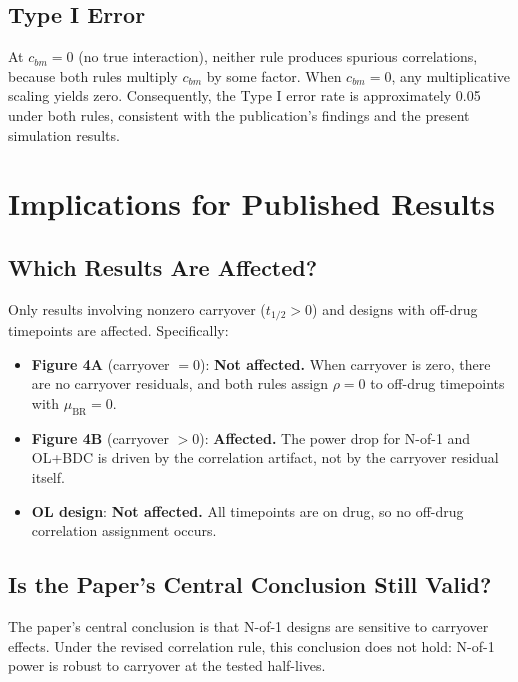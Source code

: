 \documentclass[11pt]{article}
\begin{document}
\subsection{Type I Error}

At $c_{bm} = 0$ (no true interaction), neither rule produces
spurious correlations, because both rules multiply $c_{bm}$
by some factor. When $c_{bm} = 0$, any multiplicative
scaling yields zero. Consequently, the Type I error rate is
approximately 0.05 under both rules, consistent with the
publication's findings and the present simulation results.

\section{Implications for Published Results}

\subsection{Which Results Are Affected?}

Only results involving nonzero carryover ($t_{1/2} > 0$) and
designs with off-drug timepoints are affected. Specifically:

\begin{itemize}[nosep]
\item \textbf{Figure 4A} (carryover $= 0$): \textbf{Not
  affected.} When carryover is zero, there are no carryover
  residuals, and both rules assign $\rho = 0$ to off-drug
  timepoints with $\mu_{\text{BR}} = 0$.
\item \textbf{Figure 4B} (carryover $> 0$): \textbf{Affected.}
  The power drop for N-of-1 and OL+BDC is driven by the
  correlation artifact, not by the carryover residual itself.
\item \textbf{OL design}: \textbf{Not affected.} All
  timepoints are on drug, so no off-drug correlation
  assignment occurs.
\end{itemize}

\subsection{Is the Paper's Central Conclusion Still Valid?}

The paper's central conclusion is that N-of-1 designs are
sensitive to carryover effects. Under the revised correlation
rule, this conclusion does not hold: N-of-1 power is robust
to carryover at the tested half-lives.
\end{document}
